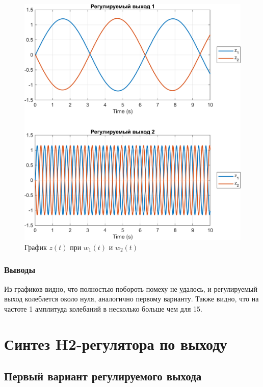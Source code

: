 \begin{figure}[H]
    \centering
    \includegraphics[width=1\linewidth]{figs/2_sim.png}
    \caption{График $z(t)$ при $w_1(t)$ и $w_2(t)$}
    \label{fig:2sim}
\end{figure}

\subsubsection{Выводы}

Из графиков видно, что полностью побороть помеху не удалось, и регулируемый выход 
колеблется около нуля, аналогично первому варианту. Также видно, что на 
частоте 1 амплитуда колебаний в несколько больше чем для 15.





\section{Синтез H2-регулятора по выходу}

\subsection{Первый вариант регулируемого выхода}

